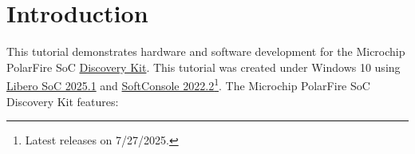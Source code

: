 \section{Introduction}
\label{sec:intro}

This tutorial demonstrates hardware and software development for the Microchip
PolarFire SoC
\href{https://www.microchip.com/en-us/development-tool/mpfs-disco-kit}
{Discovery Kit}.
%
This tutorial was created under Windows 10 using
\href{https://www.microchip.com/en-us/products/fpgas-and-plds/fpga-and-soc-design-tools/fpga/libero-software-later-versions}
{Libero SoC 2025.1} and
\href{https://www.microchip.com/en-us/products/fpgas-and-plds/fpga-and-soc-design-tools/soc-fpga/softconsole}
{SoftConsole 2022.2}\footnote{Latest releases on 7/27/2025.}.
%
The Microchip PolarFire SoC Discovery Kit features:
%
